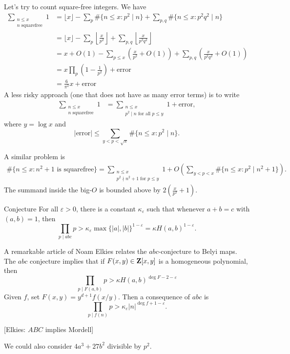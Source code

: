 Let's try to count square-free integers. We have 
\begin{align*}
  \sum_{\substack{n\leqslant x \\ n\text{ squarefree}}} 1 
    &= \lfloor x\rfloor - \sum_p \#\{n\leqslant x:p^2\mid n\} + \sum_{p,q} \#\{n\leqslant x:p^2 q^2\mid n\} \\
    &= \lfloor x\rfloor - \sum_p \left\lfloor\frac{x}{p^2}\right\rfloor + \sum_{p,q} \left\lfloor\frac{x}{p^2 q^2}\right\rfloor \\
    &= x+O(1) - \sum_{p\leqslant x} \left(\frac{x}{p^2} + O(1)\right) + \sum_{p,q} \left(\frac{x}{p^2 q^2}+O(1)\right) \\
    &= x\prod_p \left(1-\frac{1}{p^2}\right) + \text{error} \\
    &= \frac{6}{\pi^2} x + \text{error}
\end{align*}
A less risky approach (one that does not have as many error terms) is to write 
\begin{align*}
  \sum_{\substack{n\leqslant x \\ n\text{ squarefree}}} 1
    &= \sum_{\substack{n\leqslant x \\ p^2\mid n\text{ for all }p\leqslant y}} 1 + \text{error} ,
\end{align*}
where $y=\log x$ and 
\[
  |\text{error}| \leqslant \sum_{y<p<\sqrt x} \# \{n\leqslant x:p^2\mid n\} .
\]

A similar problem is 
\begin{align*}
  \#\{n\leqslant x:n^2+1\text{ is squarefree}\} = \sum_{\substack{n\leqslant x \\ p^2\nmid n^2+1\text{ for }p\leqslant y}} 1 + O\left(\sum_{y<p<x} \# \{n\leqslant x:p^2\mid n^2+1\}\right) .
\end{align*}
The summand inside the big-$O$ is bounded above by 
$2\left(\frac{x}{p^2} + 1\right)$. 

\begin{enonce}{Conjecture}
For all $\varepsilon>0$, there is a constant $\kappa_\varepsilon$ such that 
whenever $a+b=c$ with $(a,b)=1$, then 
\[
  \prod_{p\mid a b c} p > \kappa_\varepsilon \max\{|a|,|b|\}^{1-\varepsilon} = \kappa H(a,b)^{1-\varepsilon} .
\]
\end{enonce}
A remarkable article of Noam Elkies relates the $abc$-conjecture to 
Belyi maps. The $abc$ conjecture implies that if $F(x,y)\in \mathbf{Z}[x,y]$ is a 
homogeneous polynomial, then 
\[
  \prod_{p\mid F(a,b)} p > \kappa H(a,b)^{\deg F-2-\varepsilon}
\]
Given $f$, set $F(x,y) = y^{d+1} f(x/y)$. Then a consequence of $abc$ is 
\[
  \prod_{p\mid f(n)} p > \kappa_\varepsilon |n|^{\deg f+1-\varepsilon} .
\]

[Elkies: $ABC$ implies Mordell]

We could also consider $4 a^3+ 27 b^2$ divisible by $p^2$. 




